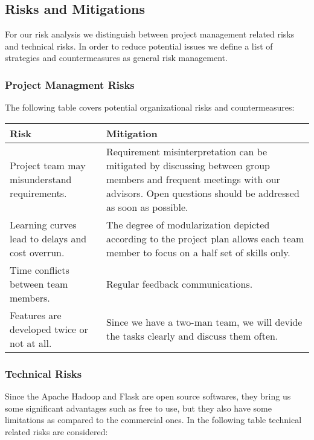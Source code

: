\documentclass[runningheads]{llncs}
\begin{document}
\subsection{Risks and Mitigations}
For our risk analysis we distinguish between project management related risks and technical risks. In order to reduce potential issues we define a list of strategies and countermeasures as general risk management.

\subsubsection{Project Managment Risks}

The following table covers potential organizational risks and countermeasures:\\

\renewcommand\arraystretch{1.5}
\begin{tabular}{p{5cm}|p{6cm}}
	Risk& Mitigation\\
	\hline
	Project team may misunderstand requirements.& Requirement misinterpretation can be mitigated by discussing between group members and frequent meetings with our advisors. Open questions should be addressed as soon as possible.\\
	\hline
	Learning curves lead to delays and cost overrun.& The degree of modularization depicted according to the project plan allows each team member to focus on a half set of skills only.\\
	\hline
	Time conflicts between team members.& Regular feedback communications.\\
	\hline
	Features are developed twice or not at all.& Since we have a two-man team, we will devide the tasks clearly and discuss them often.\\
\end{tabular}

\subsubsection{Technical Risks}

Since the Apache Hadoop and Flask are open source softwares, they bring us some significant advantages such as free to use, but they also have some limitations as compared to the commercial ones. In the following table technical related risks are considered:\\
\end{document}
